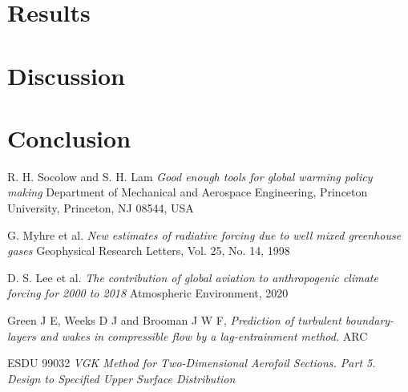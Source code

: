 \documentclass{article}
\begin{document}

\section{Results}

\section{Discussion}

\section{Conclusion}


\begin{thebibliography}{9}


    R. H. Socolow and S. H. Lam
    \emph{Good enough tools for global warming policy making}
    Department of Mechanical and Aerospace Engineering, Princeton University,
    Princeton, NJ 08544, USA

    G. Myhre et al.
    \emph{New estimates of radiative forcing due to well mixed greenhouse gases}
    Geophysical Research Letters, Vol. 25, No. 14, 1998

    D. S. Lee et al.
    \emph{The contribution of global aviation to anthropogenic climate forcing for 2000 to 2018}
    Atmospheric Environment, 2020

    Green J E, Weeks D J and Brooman J W F,
    \emph{Prediction of turbulent boundary-layers and wakes in compressible flow by a lag-entrainment method.}
    ARC

    ESDU 99032
    \emph{VGK Method for Two-Dimensional Aerofoil Sections. Part 5. Design to Specified Upper Surface Distribution}
  
\end{thebibliography}
\end{document}
